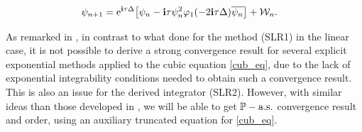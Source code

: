 \documentclass[a4paper]{amsart}
\begin{document}
         \begin{align}
         \label{SLR2}
    \psi_{n+1}&={\rm e}^{{\bf i}\tau\Delta}\big[\psi_n-{\bf i}\tau\psi_n^2\varphi_1(-2{\bf i}\tau\Delta)\overline{\psi_n}\big]+\mathcal{W}_n.
        \end{align}

As remarked in \cite{cui}, in contrast to what done for the method (SLR1) in the linear case, it is not possible to derive a strong convergence result for several explicit exponential methods applied to the cubic equation \eqref{cub_eq}, due to the lack of exponential integrability conditions needed to obtain such a convergence result. This is also an issue for the derived integrator (SLR2). However, with similar ideas than those developed in \cite{deb0}, we will be able to get $\mathbb{P}-{\rm a.s.}$ convergence result and order, using an auxiliary truncated equation for \eqref{cub_eq}.
\end{document}

